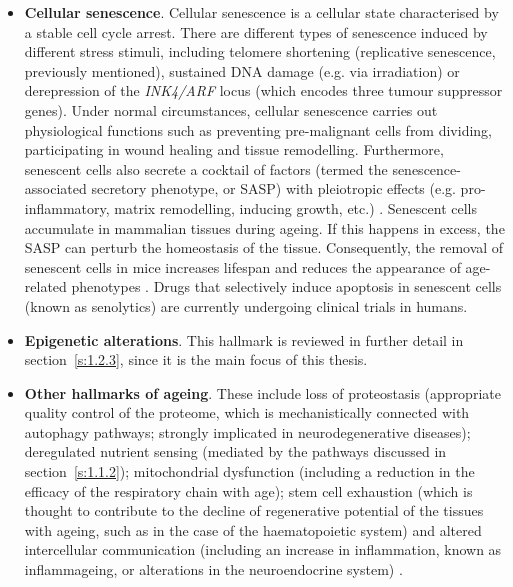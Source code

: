 \begin{itemize}
	\item \textbf{Cellular senescence}. Cellular senescence is a cellular state characterised by a stable cell cycle arrest. There are different types of senescence induced by different stress stimuli, including telomere shortening (replicative senescence, previously mentioned), sustained DNA damage (e.g. via irradiation) or derepression of the \textit{INK4/ARF} locus (which encodes three tumour suppressor genes)\citep{Lopez-Otin2013,Herranz2018}. Under normal circumstances, cellular senescence carries out physiological functions such as preventing pre-malignant cells from dividing, participating in wound healing and tissue remodelling. Furthermore, senescent cells also secrete a cocktail of factors (termed the senescence-associated secretory phenotype, or \acrshort{SASP}) with pleiotropic effects (e.g. pro-inflammatory, matrix remodelling, inducing growth, etc.) \citep{Herranz2018}. Senescent cells accumulate in mammalian tissues during ageing. If this happens in excess, the SASP can perturb the homeostasis of the tissue. Consequently, the removal of senescent cells in mice increases lifespan and reduces the appearance of age-related phenotypes \citep{Baker2011,Baker2016,Xu2018}. Drugs that selectively induce apoptosis in senescent cells (known as senolytics) \citep{Kirkland2017} are currently undergoing clinical trials in humans. 
	
	\item \textbf{Epigenetic alterations}. This hallmark is reviewed in further detail in section~\ref{s:1.2.3}, since it is the main focus of this thesis.
	
	\item \textbf{Other hallmarks of ageing}. These include loss of proteostasis (appropriate quality control of the proteome, which is mechanistically connected with autophagy pathways; strongly implicated in neurodegenerative diseases); deregulated nutrient sensing (mediated by the pathways discussed in section~\ref{s:1.1.2}); mitochondrial dysfunction (including a reduction in the efficacy of the respiratory chain with age); stem cell exhaustion (which is thought to contribute to the decline of regenerative potential of the tissues with ageing, such as in the case of the haematopoietic system) and altered intercellular communication (including an increase in inflammation, known as inflammageing, or alterations in the neuroendocrine system) \citep{Lopez-Otin2013}.

	
\end{itemize}

